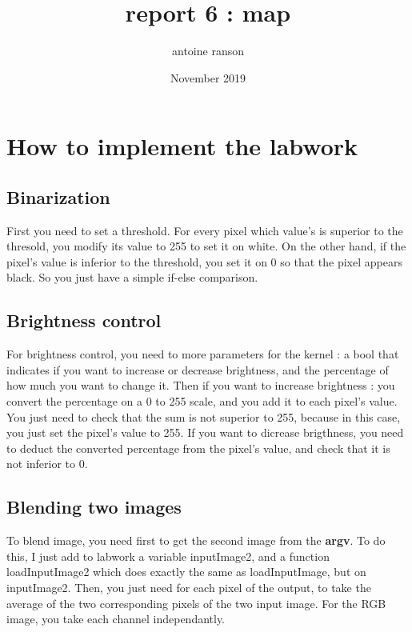 \documentclass{article}
\title{report 6 : map}
\author{antoine ranson }
\date{November 2019}
\begin{document}
 
\maketitle 
\section{How to implement the labwork} 
\subsection{Binarization} 
First you need to set a threshold. For every pixel which value's is superior to the thresold, you modify its value to 255 to set it on white.
On the other hand, if the pixel's value is inferior to the threshold, you set it on 0 so that the pixel appears black. So you just have a simple if-else comparison. 

\subsection{Brightness control} 
For brightness control, you need to more parameters for the kernel : a bool that indicates if you want to increase or decrease brightness, and the percentage of how much you want to change 
it.\newline
Then if you want to increase brightness : you convert the percentage on a 0 to 255 scale, and you add it to each pixel's value. You just need to check that the sum is not superior to 255, because in this case, 
you just set the pixel's value to 255.\newline
 If you want to dicrease brigthness, you need to deduct the converted percentage from the pixel's value, and check that it is not inferior to 0. \subsection{Blending two 
images} To blend image, you need first to get the second image from the \textbf{argv}. To do this, I just add to 
labwork a variable inputImage2, and a function loadInputImage2 which does exactly the same as loadInputImage, 
but on inputImage2.\newline 
Then, you just need for each pixel of the output, to take the average of the two 
corresponding pixels of the two input image. For the RGB image, you take each channel independantly. 
\end{document}
